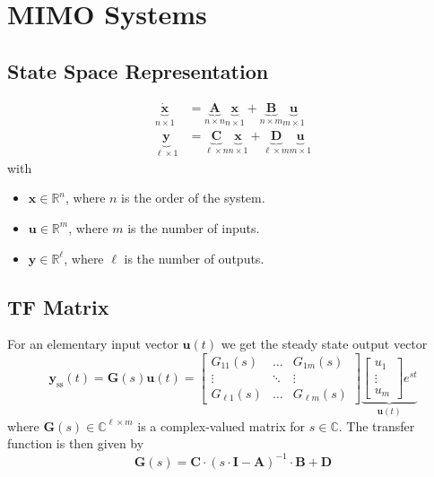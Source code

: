 \section{MIMO Systems}

\subsection{State Space Representation}
\noindent\begin{align*}
    \underbrace{\dot{\mathbf{x}}}_{n\times 1} & = \underbrace{\mathbf{A}}_{n\times n}   \underbrace{\mathbf{x}}_{n\times1}+\underbrace{\mathbf{B}}_{n\times m}   \underbrace{\mathbf{u}}_{m\times1} \\
    \underbrace{\mathbf{y}}_{\ell\times 1}    & = \underbrace{\mathbf{C}}_{\ell\times n}\underbrace{\mathbf{x}}_{n\times1}+\underbrace{\mathbf{D}}_{\ell\times m}\underbrace{\mathbf{u}}_{m\times1}
\end{align*}
with
\begin{itemize}
    \item $\mathbf{x}\in\mathbb{R}^n$, where $n$ is the order of the system.
    \item $\mathbf{u}\in\mathbb{R}^m$, where $m$ is the number of inputs.
    \item $\mathbf{y}\in\mathbb{R}^\ell$, where $\ell$ is the number of outputs.
\end{itemize}

\subsection{TF Matrix}


For an elementary input vector $\mathbf{u}(t)$ we get the steady state output vector
\begin{equation*}
    \mathbf{y}_{{\mathrm{ss}}}(t)=\mathbf{G}(s)\mathbf{u}(t)=
    \begin{bmatrix}G_{11}(s)    & \ldots & G_{1m}(s)     \\
               \vdots       & \ddots & \vdots        \\
               G_{\ell1}(s) & \ldots & G_{\ell m}(s)
    \end{bmatrix}
    \underbrace{
    \begin{bmatrix}u_{1}  \\
        \vdots \\
        u_{m}
    \end{bmatrix}e^{st}}_{\mathbf{u}(t)}
\end{equation*}
where $\mathbf{G}(s)\in\mathbb{\mathbb{C}}^{\ell\times m}$ is a complex-valued matrix for $s\in \mathbb{C}$. The transfer function is then given by
\begin{equation*}
    \mathbf{G}(s)=\mathbf{C}\cdot{(s\cdot\mathbf{I}-\mathbf{A})}^{-1}\cdot \mathbf{B}+\mathbf{D}
\end{equation*}

